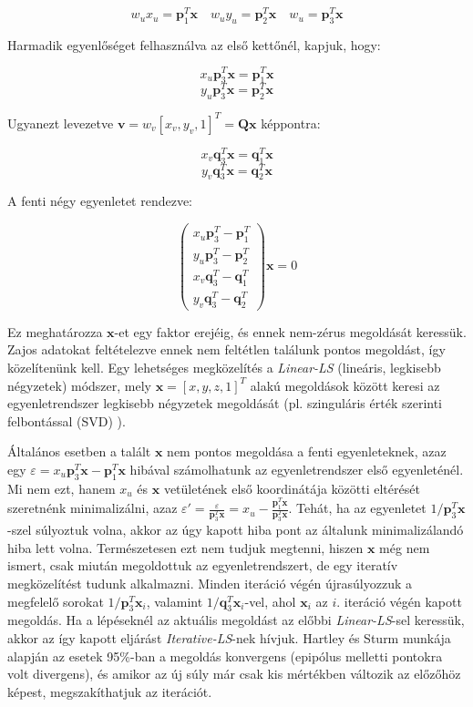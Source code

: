 \[w_ux_u = \mathbf{p}_1^T\mathbf{x} \quad w_uy_u = \mathbf{p}_2^T\mathbf{x} \quad w_u = \mathbf{p}_3^T\mathbf{x}\]

Harmadik egyenlőséget felhasználva az első kettőnél, kapjuk, hogy:

\[x_u\mathbf{p}_3^T\mathbf{x} = \mathbf{p}_1^T\mathbf{x}\]
\[y_u\mathbf{p}_3^T\mathbf{x} = \mathbf{p}_2^T\mathbf{x}\]

Ugyanezt levezetve $\mathbf{v} = w_v[x_v, y_v, 1]^T = \mathbf{Q}\mathbf{x}$ képpontra:

\[x_v\mathbf{q}_3^T\mathbf{x} = \mathbf{q}_1^T\mathbf{x}\]
\[y_v\mathbf{q}_3^T\mathbf{x} = \mathbf{q}_2^T\mathbf{x}\]

A fenti négy egyenletet rendezve:

\[\left( \begin{array}{c} x_u\mathbf{p}_3^T - \mathbf{p}_1^T \\ y_u\mathbf{p}_3^T - \mathbf{p}_2^T \\ x_v\mathbf{q}_3^T - \mathbf{q}_1^T \\ y_v\mathbf{q}_3^T - \mathbf{q}_2^T \end{array} \right) \mathbf{x} = 0\]

Ez meghatározza $\mathbf{x}$-et egy faktor erejéig, és ennek nem-zérus megoldását keressük. Zajos adatokat feltételezve ennek nem feltétlen találunk pontos megoldást, így közelítenünk kell. Egy lehetséges megközelítés a \textit{Linear-LS} (lineáris, legkisebb négyzetek) módszer, mely $\mathbf{x} = [x, y, z, 1]^T$ alakú megoldások között keresi az egyenletrendszer legkisebb négyzetek megoldását (pl. szinguláris érték szerinti felbontással (SVD) \cite{cs-svd}). 

Általános esetben a talált $\mathbf{x}$ nem pontos megoldása a fenti egyenleteknek, azaz egy $\varepsilon = x_u\mathbf{p}_3^T\mathbf{x} - \mathbf{p}_1^T\mathbf{x}$ hibával számolhatunk az egyenletrendszer első egyenleténél. Mi nem ezt, hanem $x_u$ és $\mathbf{x}$ vetületének első koordinátája közötti eltérését szeretnénk minimalizálni, azaz $\varepsilon' = \frac{\varepsilon}{\mathbf{p}_3^T\mathbf{x}} = x_u - \frac{\mathbf{p}_1^T\mathbf{x}}{\mathbf{p}_3^T\mathbf{x}}$. Tehát, ha az egyenletet $1 / \mathbf{p}_3^T\mathbf{x}$-szel súlyoztuk volna, akkor az úgy kapott hiba pont az általunk minimalizálandó hiba lett volna. Természetesen ezt nem tudjuk megtenni, hiszen $\mathbf{x}$ még nem ismert, csak miután megoldottuk az egyenletrendszert, de egy iteratív megközelítést tudunk alkalmazni. Minden iteráció végén újrasúlyozzuk a megfelelő sorokat $1 / \mathbf{p}_3^T\mathbf{x}_i$, valamint $1 / \mathbf{q}_3^T\mathbf{x}_i$-vel, ahol $\mathbf{x}_i$ az $i$. iteráció végén kapott megoldás. Ha a lépéseknél az aktuális megoldást az előbbi \textit{Linear-LS}-sel keressük, akkor az így kapott eljárást \textit{Iterative-LS}-nek hívjuk. Hartley és Sturm \cite[5.2 szekció]{hartley-triangulation} munkája alapján az esetek 95\%-ban a megoldás konvergens (epipólus melletti pontokra volt divergens), és amikor az új súly már csak kis mértékben változik az előzőhöz képest, megszakíthatjuk az iterációt.

